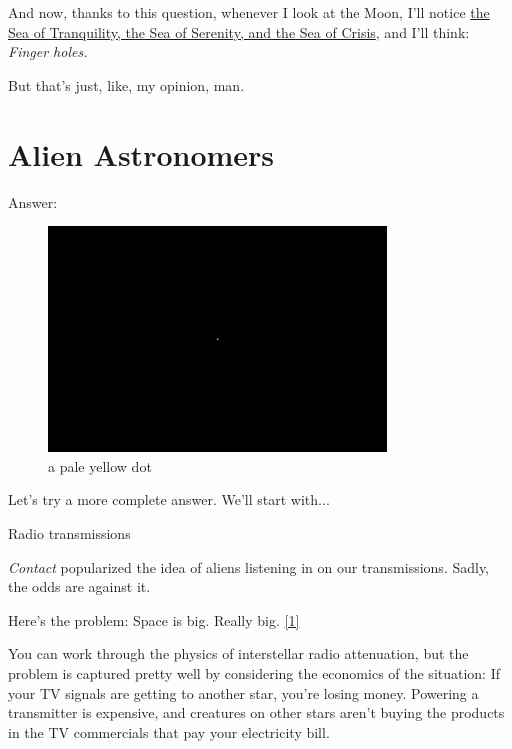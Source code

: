 {{And now, thanks to this question, whenever I look at the Moon, I’ll notice \href{http://www.google.com/url?q=http\%3A\%2F\%2Fen.wikipedia.org\%2Fwiki\%2FFile\%3AMoon\_names.svg&sa=D&sntz=1&usg=AFQjCNHIe4YcJnAZYmMY278G3Ko63hJnKQ}{the Sea of Tranquility, the Sea of Serenity, and the Sea of Crisis}, and I’ll think: \emph{Finger holes.} }

{But that’s just, like, my opinion, man.}

{
\chapter{Alien Astronomers}
}

\hfill{}

{Answer:}

\begin{figure}[!htbp]
\centering
\includegraphics[scale=0.5, max width=0.8\textwidth]{imgs/a/47/life_dot.png}
\caption{a pale yellow dot}
\end{figure}

{Let’s try a more complete answer. We’ll start with...}

{Radio transmissions}

{ \emph{Contact} popularized the idea of aliens listening in on our transmissions. Sadly, the odds are against it.}

{Here’s the problem: Space is big. Really big. \href{http://www.goodreads.com/book/show/11.The\_Hitchhiker\_s\_Guide\_to\_the\_Galaxy}{[1]}}

{You can work through the physics of interstellar radio attenuation, but the problem is captured pretty well by considering the economics of the situation: If your TV signals are getting to another star, you’re losing money. Powering a transmitter is expensive, and creatures on other stars aren’t buying the products in the TV commercials that pay your electricity bill.}

}
